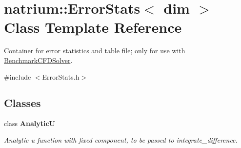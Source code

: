 \hypertarget{classnatrium_1_1ErrorStats}{
\section{natrium::ErrorStats$<$ dim $>$ Class Template Reference}
\label{classnatrium_1_1ErrorStats}
}


Container for error statistics and table file; only for use with \hyperlink{classnatrium_1_1BenchmarkCFDSolver}{BenchmarkCFDSolver}.  


{\ttfamily \#include $<$ErrorStats.h$>$}\subsection*{Classes}
\begin{DoxyCompactItemize}
\item 
class {\bfseries AnalyticU}
\begin{DoxyCompactList}\small\item\em Analytic u function with fixed component, to be passed to integrate\_\-difference. \item\end{DoxyCompactList}\end{DoxyCompactItemize}
